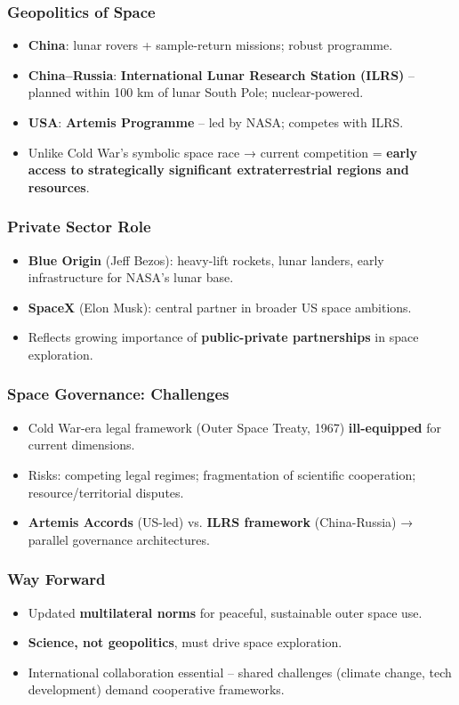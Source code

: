 \subsubsection*{Geopolitics of Space}
\begin{itemize}
  \item \textbf{China}: lunar rovers + sample-return missions; robust programme.
  \item \textbf{China--Russia}: \textbf{International Lunar Research Station (ILRS)} -- planned within 100 km of lunar South Pole; nuclear-powered.
  \item \textbf{USA}: \textbf{Artemis Programme} -- led by NASA; competes with ILRS.
  \item Unlike Cold War's symbolic space race → current competition = \textbf{early access to strategically significant extraterrestrial regions and resources}.
\end{itemize}

\subsubsection*{Private Sector Role}
\begin{itemize}
  \item \textbf{Blue Origin} (Jeff Bezos): heavy-lift rockets, lunar landers, early infrastructure for NASA's lunar base.
  \item \textbf{SpaceX} (Elon Musk): central partner in broader US space ambitions.
  \item Reflects growing importance of \textbf{public-private partnerships} in space exploration.
\end{itemize}

\subsubsection*{Space Governance: Challenges}
\begin{itemize}
  \item Cold War-era legal framework (Outer Space Treaty, 1967) \textbf{ill-equipped} for current dimensions.
  \item Risks: competing legal regimes; fragmentation of scientific cooperation; resource/territorial disputes.
  \item \textbf{Artemis Accords} (US-led) vs. \textbf{ILRS framework} (China-Russia) → parallel governance architectures.
\end{itemize}

\subsubsection*{Way Forward}
\begin{itemize}
  \item Updated \textbf{multilateral norms} for peaceful, sustainable outer space use.
  \item \textbf{Science, not geopolitics}, must drive space exploration.
  \item International collaboration essential -- shared challenges (climate change, tech development) demand cooperative frameworks.
\end{itemize}


